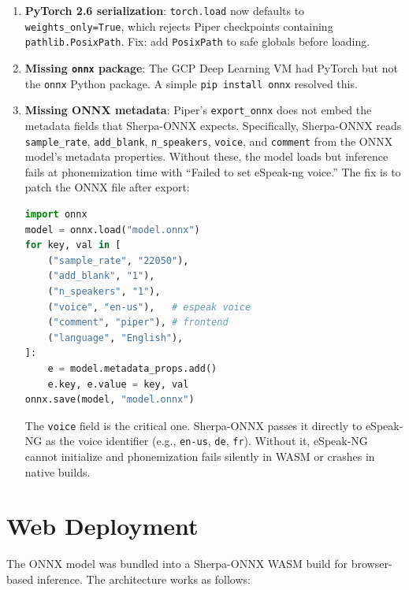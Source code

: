 \documentclass[10pt,a4paper,twocolumn]{article}
\begin{document}
\begin{enumerate}
    \item \textbf{PyTorch 2.6 serialization}: \texttt{torch.load} now defaults to \texttt{weights\_only=True}, which rejects Piper checkpoints containing \texttt{pathlib.PosixPath}. Fix: add \texttt{PosixPath} to safe globals before loading.
    \item \textbf{Missing \texttt{onnx} package}: The GCP Deep Learning VM had PyTorch but not the \texttt{onnx} Python package. A simple \texttt{pip install onnx} resolved this.

    \item \textbf{Missing ONNX metadata}: Piper's \texttt{export\_onnx} does not embed the metadata fields that Sherpa-ONNX expects. Specifically, Sherpa-ONNX reads \texttt{sample\_rate}, \texttt{add\_blank}, \texttt{n\_speakers}, \texttt{voice}, and \texttt{comment} from the ONNX model's metadata properties. Without these, the model loads but inference fails at phonemization time with ``Failed to set eSpeak-ng voice.'' The fix is to patch the ONNX file after export:

\begin{lstlisting}[language=Python,basicstyle=\ttfamily\scriptsize]
import onnx
model = onnx.load("model.onnx")
for key, val in [
    ("sample_rate", "22050"),
    ("add_blank", "1"),
    ("n_speakers", "1"),
    ("voice", "en-us"),   # espeak voice
    ("comment", "piper"), # frontend
    ("language", "English"),
]:
    e = model.metadata_props.add()
    e.key, e.value = key, val
onnx.save(model, "model.onnx")
\end{lstlisting}

    The \texttt{voice} field is the critical one. Sherpa-ONNX passes it directly to eSpeak-NG as the voice identifier (e.g., \texttt{en-us}, \texttt{de}, \texttt{fr}). Without it, eSpeak-NG cannot initialize and phonemization fails silently in WASM or crashes in native builds.
\end{enumerate}

\section{Web Deployment}
\label{sec:web}

The ONNX model was bundled into a Sherpa-ONNX WASM build for browser-based inference. The architecture works as follows:
\end{document}
